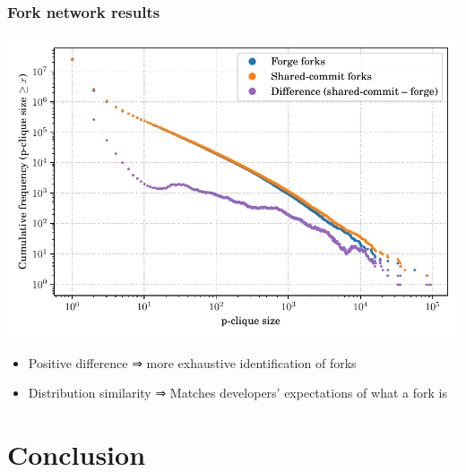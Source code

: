 \documentclass[aspectratio=169,xcolor=table]{beamer}
\begin{document}
    \begin{frame}
        \frametitle{Fork network results}
        \begin{center}
            \includegraphics[width=0.6\linewidth]{../img/forks/fork-clique-partition-freq-distribution.pdf}
        \end{center}
        \begin{block}{}
            \begin{itemize}
                \item Positive difference ⇒ more exhaustive identification of
                    forks
                \item Distribution similarity ⇒ Matches developers'
                    expectations of what a fork is
            \end{itemize}
        \end{block}
    \end{frame}


    \section{Conclusion}
\end{document}

